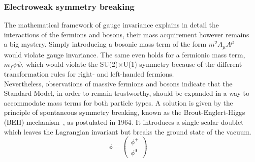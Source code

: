 \subsubsection{Electroweak symmetry breaking} \label{sec::EWSB}
The mathematical framework of gauge invariance explains in detail the interactions of the fermions and bosons, their mass acquirement however remains a big mystery. Simply introducing a bosonic mass term of the form $m^{2} A_{\mu}A^{\mu}$ would violate gauge invariance.
The same even holds for a fermionic mass term, $m_{f} \psi \bar{\psi}$, which would violate the SU(2)$\times$U(1) symmetry because of the different transformation rules for right- and left-handed fermions.
\\
Nevertheless, observations of massive fermions and bosons indicate that the Standard Model, in order to remain trustworthy, should be expanded in a way to accommodate mass terms for both particle types.
A solution is given by the principle of spontaneous symmetry breaking, known as the Brout-Englert-Higgs (BEH) mechanism~\cite{Englert, Higgs, Kibble}, as postulated in 1964.
It introduces a single scalar doublet which leaves the Lagrangian invariant but breaks the ground state of the vacuum.
\begin{equation}
 \phi = \begin{pmatrix}
            \phi^{+} \\
            \phi^{0}
           \end{pmatrix}
\end{equation}
